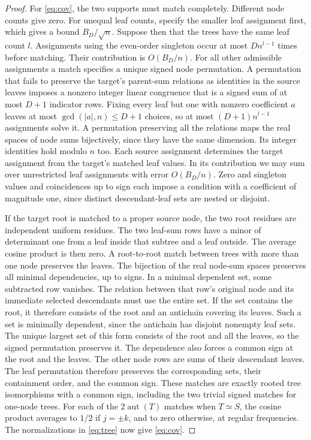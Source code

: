 \documentclass[preprints,article,submit,oneauthor]{Definitions/mdpi}
\newcommand{\aut}{\operatorname{aut}}
\newcommand{\abs}[1]{\lvert #1\rvert}
\begin{document}
\begin{proof}
For \eqref{eq:cov}, the two supports must match completely. Different
node counts give zero. For unequal leaf counts, specify the smaller
leaf assignment first, which gives a bound \(B_D/\sqrt n\). Suppose
then that the trees have the same leaf count \(l\). Assignments using
the even-order singleton occur at most \(Dn^{l-1}\) times before
matching. Their contribution is \(O(B_D/n)\). For all other admissible
assignments a match specifies a unique signed node permutation.
A permutation that fails to preserve the target's parent-sum relations
as identities in the source leaves imposes a nonzero integer linear
congruence that is a signed sum of at most \(D+1\) indicator rows.
Fixing every leaf but one with nonzero coefficient \(a\) leaves
at most \(\gcd(\abs a,n)\le D+1\) choices, so at most
\((D+1)n^{l-1}\) assignments solve it. A permutation preserving all
the relations maps the real spaces of node sums bijectively, since
they have the same dimension. Its integer identities hold modulo
\(n\) too. Each source assignment determines the target assignment
from the target's matched leaf values. In its contribution we may
sum over unrestricted leaf assignments with error \(O(B_D/n)\).
Zero and singleton values and coincidences up to sign each impose a condition
with a coefficient of magnitude one, since distinct descendant-leaf
sets are nested or disjoint.

If the target root is matched to a proper source node, the two root
residues are independent uniform residues. The two leaf-sum rows have
a minor of determinant one from a leaf inside that subtree and a
leaf outside. The average cosine product is then zero.
A root-to-root match between trees with more than one node preserves
the leaves. The bijection of the real node-sum spaces preserves all
minimal dependencies, up to signs. In a minimal dependent set,
some subtracted row vanishes.
The relation between that row's original node and its immediate
selected descendants must use the entire set. If the set contains
the root, it therefore consists of the root and an antichain covering
its leaves. Such a set is minimally dependent, since the antichain
has disjoint nonempty leaf sets. The unique largest set of this form
consists of the root and all the leaves, so the signed permutation
preserves it. The dependence also forces a common sign at the root
and the leaves. The other node rows are sums of their descendant
leaves. The leaf permutation therefore preserves the corresponding
sets, their containment order, and the common sign. These matches are
exactly rooted tree isomorphisms with a common sign, including the
two trivial signed matches for one-node trees. For each of the
\(2\aut(T)\) matches when \(T\simeq S\), the cosine product averages to
\(1/2\) if \(j=\pm k\), and to zero otherwise, at regular frequencies.
The normalizations in \eqref{eq:tree} now give \eqref{eq:cov}.
\end{proof}
\end{document}
